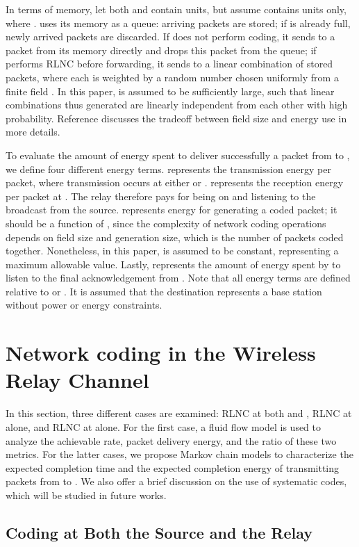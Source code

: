 \documentclass[journal, letterpaper]{IEEEtran}
\begin{document}
In terms of memory, let both  and  contain  units, but assume  contains  units only, where .  uses its memory as a queue: arriving packets are stored; if  is already full, newly arrived packets are discarded. If  does not perform coding, it sends to  a packet from its memory directly and drops this packet from the queue; if  performs RLNC before forwarding, it sends to  a linear combination of stored packets, where each is weighted by a random number chosen uniformly from a finite field . In this paper,  is assumed to be sufficiently large, such that linear combinations thus generated are linearly independent from each other with high probability. Reference \cite{angelopoulos2011energy} discusses the tradeoff between field size and energy use in more details.

To evaluate the amount of energy spent to deliver successfully a packet from  to , we define four different energy terms.  represents the transmission energy per packet, where transmission occurs at either  or .  represents the reception energy per packet at . The relay therefore pays for being on and listening to the broadcast from the source.  represents energy for generating a coded packet; it should be a function of , since the complexity of network coding operations depends on field size and generation size, which is the number of packets coded together. Nonetheless, in this paper,  is assumed to be constant, representing a maximum allowable value. Lastly,  represents the amount of energy spent by  to listen to the final acknowledgement from . Note that all energy terms are defined relative to  or . It is assumed that the destination  represents a base station without power or energy constraints.


\section{Network coding in the Wireless Relay Channel}\label{sec:analysis}
In this section, three different cases are examined: RLNC at both  and , RLNC at  alone, and RLNC at  alone. For the first case, a fluid flow model is used to analyze the achievable rate, packet delivery energy, and the ratio of these two metrics. For the latter cases, we propose Markov chain models to characterize the expected completion time and the expected completion energy of transmitting  packets from  to . We also offer a brief discussion on the use of systematic codes, which will be studied in future works.

\subsection{Coding at Both the Source  and the Relay }\label{subsec:rs}
\end{document}
